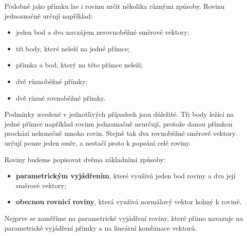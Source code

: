 Podobně jako přímku lze i rovinu určit několika různými způsoby. Rovinu
jednoznačně určují například:

\begin{itemize}
    \item jeden bod a dva navzájem nerovnoběžné směrové vektory;
    \item tři body, které neleží na jedné přímce;
    \item přímka a bod, který na této přímce neleží;
    \item dvě různoběžné přímky;
    \item dvě různé rovnoběžné přímky.
\end{itemize}

Podmínky uvedené v jednotlivých případech jsou důležité. Tři body ležící
na jedné přímce například rovinu jednoznačně neurčují, protože danou
přímkou prochází nekonečně mnoho rovin. Stejně tak dva rovnoběžné směrové
vektory určují pouze jeden směr, a nestačí proto k popsání celé roviny.

Roviny budeme popisovat dvěma základními způsoby:

\begin{itemize}
    \item \textbf{parametrickým vyjádřením}, které využívá jeden bod
    roviny a dva její směrové vektory;
    \item \textbf{obecnou rovnicí roviny}, která využívá normálový vektor
    kolmý k rovině.
\end{itemize}

Nejprve se zaměříme na parametrické vyjádření roviny, které přímo navazuje
na parametrické vyjádření přímky a na lineární kombinace vektorů.



